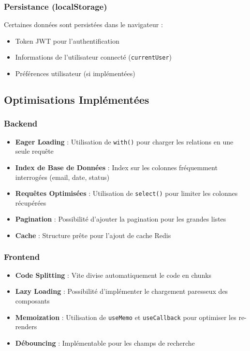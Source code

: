 \documentclass[12pt,a4paper]{report}
\begin{document}
\subsubsection{Persistance (localStorage)}

Certaines données sont persistées dans le navigateur :
\begin{itemize}
    \item Token JWT pour l'authentification
    \item Informations de l'utilisateur connecté (\texttt{currentUser})
    \item Préférences utilisateur (si implémentées)
\end{itemize}

\subsection{Optimisations Implémentées}

\subsubsection{Backend}

\begin{itemize}
    \item \textbf{Eager Loading} : Utilisation de \texttt{with()} pour charger les relations en une seule requête
    \item \textbf{Index de Base de Données} : Index sur les colonnes fréquemment interrogées (email, date, status)
    \item \textbf{Requêtes Optimisées} : Utilisation de \texttt{select()} pour limiter les colonnes récupérées
    \item \textbf{Pagination} : Possibilité d'ajouter la pagination pour les grandes listes
    \item \textbf{Cache} : Structure prête pour l'ajout de cache Redis
\end{itemize}

\subsubsection{Frontend}

\begin{itemize}
    \item \textbf{Code Splitting} : Vite divise automatiquement le code en chunks
    \item \textbf{Lazy Loading} : Possibilité d'implémenter le chargement paresseux des composants
    \item \textbf{Memoization} : Utilisation de \texttt{useMemo} et \texttt{useCallback} pour optimiser les re-renders
    \item \textbf{Débouncing} : Implémentable pour les champs de recherche
\end{itemize}
\end{document}
